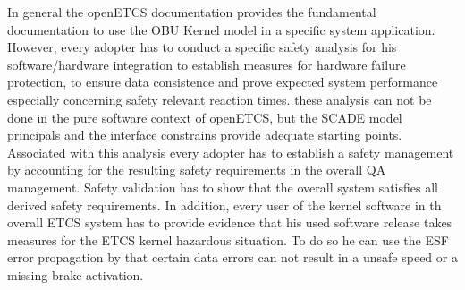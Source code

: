 \documentclass{template/openetcs_report}
\begin{document}
In general the openETCS documentation provides the fundamental documentation to use the OBU Kernel model in a specific system application. However, every adopter has to conduct a specific safety analysis for his software/hardware integration to establish measures for hardware failure protection, to ensure data consistence and prove expected system performance especially concerning safety relevant reaction times. these analysis can not be done in the pure software context of openETCS, but the SCADE model principals and the interface constrains provide adequate starting points. Associated with this analysis every adopter has to establish a safety management by accounting for the resulting safety requirements in the overall QA management. Safety validation has to show that the overall system satisfies all derived safety requirements. In addition, every user of the kernel software in th overall ETCS system has to provide evidence that his used software release takes measures for the ETCS kernel hazardous situation. To do so he can use the ESF error propagation by that certain data errors can not result in a unsafe speed or a missing brake activation.

%
%


\end{document}
